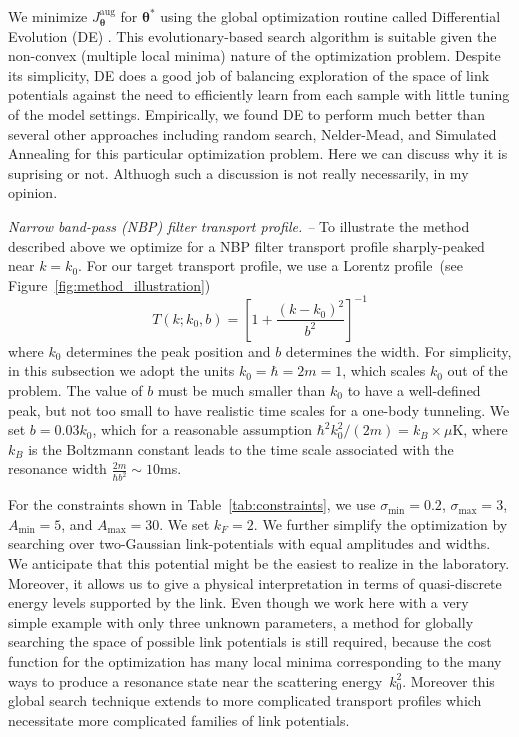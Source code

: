 \documentclass[twocolumn,amsmath,amssymb,showpacs,pra,superscriptaddress,aps]{revtex4-1}
\begin{document}
We minimize $J_{\bm{\theta}}^{\mathrm{aug}}$ for $\bm{\theta}^*$ using the global optimization routine called Differential Evolution (DE) \cite{storn1997differential}. This evolutionary-based search algorithm is suitable given the non-convex (multiple local minima) nature of the optimization problem. Despite its simplicity, DE does a good job of balancing exploration of the space of link potentials against the need to efficiently learn from each sample with little tuning of the model settings. Empirically, we found DE to perform much better than several other approaches including random search, Nelder-Mead, and Simulated Annealing for this particular optimization problem. {\color{green} Here we can discuss why it is suprising or not. Althuogh such a discussion is not really 
necessarily, in my opinion.}



{\it Narrow band-pass (NBP) filter transport profile. --}
To illustrate the method described above we optimize for a NBP filter transport profile sharply-peaked near $k=k_0$. 
For our target transport profile, we use a Lorentz profile~(see Figure~\ref{fig:method_illustration})
\begin{equation}\label{eq:Ttarget}
  T(k; k_0,b) = \left[1 + \frac{(k-k_0)^2}{b^2}\right]^{-1}
\end{equation}
where $k_0$ determines the peak position and $b$ determines the width. 
For simplicity, in this subsection we adopt the units $k_0=\hbar=2m=1$, which scales $k_0$
out of the problem. The value of $b$ must be much smaller than $k_0$ 
to have a well-defined peak, but not too small to have realistic time scales
for a one-body tunneling. We set $b=0.03 k_0$, which for a reasonable assumption 
$\hbar^2k_0^2/(2m)=k_B\times \mu$K, where $k_B$ is the Boltzmann constant leads to 
the time scale associated with the resonance width $\frac{2m}{\hbar b^2}\sim 10$ms.

 For the constraints shown in Table~\ref{tab:constraints}, we use $\sigma_{\mathrm{min}}=0.2$, $\sigma_{\mathrm{max}}=3$, $A_{\mathrm{min}}=5$, and $A_{\mathrm{max}}=30$. We set $k_F=2$. We further simplify the optimization by searching over two-Gaussian link-potentials with equal amplitudes and widths. We anticipate that this potential might be the easiest to realize in the laboratory. 
Moreover, it allows us to give a physical interpretation in terms of quasi-discrete energy levels supported by the link.  Even though we work here with a very simple example with only three unknown parameters, a method for globally searching the space of possible link potentials is still required, because the cost function for the optimization has many local minima corresponding to the many ways to produce a resonance state near the scattering energy~$k_0^2$. Moreover this global search technique extends to more complicated transport profiles which necessitate more complicated families of link potentials.
\end{document}
